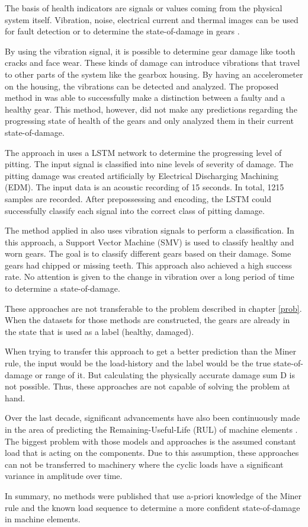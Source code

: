 The basis of health indicators are signals or values coming from the physical system itself. Vibration, noise, electrical current and thermal images can be used for fault detection or to determine the state-of-damage in gears \cite{Prav,KaraACUSTIC,Medina,Kara}.

By using the vibration signal, it is possible to determine gear damage like tooth cracks and face wear. These kinds of damage can introduce vibrations that travel to other parts of the system like the gearbox housing. By having an accelerometer on the housing, the vibrations can be detected and analyzed. The proposed method in \cite{Prav} was able to successfully make a distinction between a faulty and a healthy gear. This method, however, did not make any predictions regarding the progressing state of health of the gears and only analyzed them in their current state-of-damage. 

The approach in \cite{Medina} uses a LSTM network to determine the progressing level of pitting. The input signal is classified into nine levels of severity of damage. The pitting damage was created artificially by Electrical Discharging Machining (EDM). The input data is an acoustic recording of 15 seconds. In total, 1215 samples are recorded. After prepossessing and encoding, the LSTM could successfully classify each signal into the correct class of pitting damage.

The method applied in \cite{RTiwari} also uses vibration signals to perform a classification. In this approach, a Support Vector Machine (SMV) is used to classify healthy and worn gears. The goal is to classify different gears based on their damage. Some gears had chipped or missing teeth. This approach also achieved a high success rate. No attention is given to the change in vibration over a long period of time to determine a state-of-damage. 


These approaches are not transferable to the problem described in chapter \ref{prob}. When the datasets for those methods are constructed, the gears are already in the state that is used as a label (healthy, damaged).

When trying to transfer this approach to get a better prediction than the Miner rule, the input would be the load-history and the label would be the true state-of-damage or range of it. But calculating the physically accurate damage sum D is not possible. Thus, these approaches are not capable of solving the problem at hand. 

Over the last decade, significant advancements have also been continuously made in the area of predicting the Remaining-Useful-Life (RUL) of machine elements \cite{Deutsch,He,Yan}.
The biggest problem with those models and approaches is the assumed constant load that is acting on the components. Due to this assumption, these approaches can not be transferred to machinery where the cyclic loads have a significant variance in amplitude over time.

In summary, no methods were published that use a-priori knowledge of the Miner rule and the known load sequence to determine a more confident state-of-damage in machine elements.

